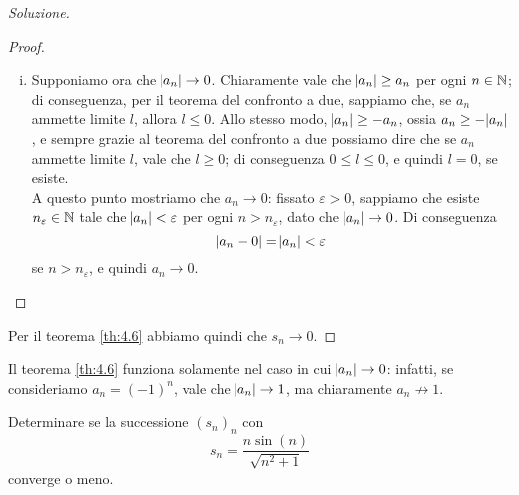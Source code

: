 \begin{proof}[Soluzione]
\begin{tcolorbox}
\begin{proof}
\begin{enumerate}[(i)]
                \item Supponiamo ora che $\abs{a_n}\to 0$. Chiaramente vale che $\abs{a_n}\ge a_n$ per ogni $n\in\amsbb{N}$; di conseguenza, per il teorema del confronto a due, sappiamo che, se $a_n$ ammette limite $l$, allora $l\le 0$. Allo stesso modo, $\abs{a_n}\ge -a_n$, ossia $a_n \ge -\abs{a_n}$, e sempre grazie al teorema del confronto a due possiamo dire che se $a_n$ ammette limite $l$, vale che $l\ge 0$; di conseguenza $0\le l \le 0$, e quindi $l=0$, se esiste.\\
                A questo punto mostriamo che $a_n \to 0$: fissato $\varepsilon>0$, sappiamo che esiste $n_\varepsilon\in\amsbb{N}$ tale che $\abs{a_n}<\varepsilon$ per ogni $n>n_\varepsilon$, dato che $\abs{a_n}\to 0$. Di conseguenza
                \[
                \abs{a_n - 0} = \abs{a_n}<\varepsilon
                \]
                se $n>n_\varepsilon$, e quindi $a_n \to 0$.
            \end{enumerate}
        \end{proof}
    \end{tcolorbox}
    Per il teorema \ref{th:4.6} abbiamo quindi che $s_n \to 0$.
\end{proof}
\begin{remark}
    Il teorema \ref{th:4.6} funziona solamente nel caso in cui $\abs{a_n} \to 0$: infatti, se consideriamo $a_n = (-1)^n$, vale che $\abs{a_n}\to 1$, ma chiaramente $a_n \not\to 1$.
\end{remark}
\begin{exercise}
    \label{ex:4.5}
    Determinare se la successione $(s_n)_n$ con
    \[
    s_n = \frac{n\sin(n)}{\sqrt{n^2+1}}
    \]
    converge o meno.
\end{exercise}
